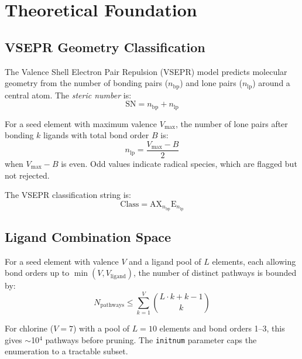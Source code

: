 \documentclass[11pt,a4paper]{article}
\begin{document}
\section{Theoretical Foundation}
\label{sec:theory}

\subsection{VSEPR Geometry Classification}

The Valence Shell Electron Pair Repulsion (VSEPR) model predicts
molecular geometry from the number of bonding pairs ($n_\text{bp}$)
and lone pairs ($n_\text{lp}$) around a central atom.  The
\emph{steric number} is:
\begin{equation}
  \text{SN} = n_\text{bp} + n_\text{lp}
\end{equation}

For a seed element with maximum valence $V_\text{max}$, the number of
lone pairs after bonding $k$ ligands with total bond order $B$ is:
\begin{equation}
  n_\text{lp} = \frac{V_\text{max} - B}{2}
  \label{eq:lone_pairs}
\end{equation}
when $V_\text{max} - B$ is even.  Odd values indicate radical species,
which are flagged but not rejected.

The VSEPR classification string is:
\begin{equation}
  \text{Class} = \text{AX}_{n_\text{bp}}\text{E}_{n_\text{lp}}
\end{equation}

\subsection{Ligand Combination Space}

For a seed element with valence $V$ and a ligand pool of $L$ elements,
each allowing bond orders up to $\min(V, V_\text{ligand})$, the number
of distinct pathways is bounded by:
\begin{equation}
  N_\text{pathways} \leq \sum_{k=1}^{V} \binom{L \cdot k + k - 1}{k}
\end{equation}

For chlorine ($V = 7$) with a pool of $L = 10$ elements and bond orders
1--3, this gives $\sim$10$^4$ pathways before pruning.  The
\texttt{initnum} parameter caps the enumeration to a tractable subset.
\end{document}
